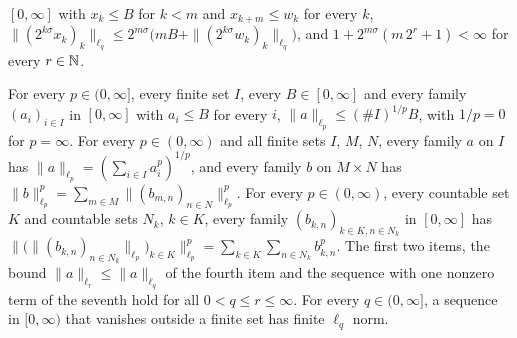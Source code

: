 \begin{lemma}
\begin{enumerate}
    $[0, \infty]$ with $x_k \leq B$ for $k < m$ and $x_{k+m} \leq w_k$ for every $k$,
    $\|(2^{k\sigma} x_k)_k\|_{\ell_q} \leq 2^{m\sigma}
    \bigl( m B + \|(2^{k\sigma} w_k)_k\|_{\ell_q} \bigr)$, and
    $1 + 2^{m\sigma} (m \, 2^r + 1) < \infty$ for every $r \in \mathbb{N}$.
\end{enumerate}
For every $p \in (0, \infty]$, every finite set $I$, every $B \in [0, \infty]$ and every family
$(a_i)_{i \in I}$ in $[0, \infty]$ with $a_i \leq B$ for every $i$,
$\|a\|_{\ell_p} \leq (\# I)^{1/p} B$, with $1/p = 0$ for $p = \infty$. For every
$p \in (0, \infty)$ and all finite sets $I$, $M$, $N$, every family $a$ on $I$ has
$\|a\|_{\ell_p} = (\sum_{i \in I} a_i^p)^{1/p}$, and every family $b$ on $M \times N$ has
$\|b\|_{\ell_p}^p = \sum_{m \in M} \|(b_{m,n})_{n \in N}\|_{\ell_p}^p$. For every
$p \in (0, \infty)$, every countable set $K$ and countable sets $N_k$, $k \in K$, every family
$(b_{k,n})_{k \in K, n \in N_k}$ in $[0, \infty]$ has
$\bigl\|\bigl(\|(b_{k,n})_{n \in N_k}\|_{\ell_p}\bigr)_{k \in K}\bigr\|_{\ell_p}^p
= \sum_{k \in K} \sum_{n \in N_k} b_{k,n}^p$.
The first two items, the bound $\|a\|_{\ell_r} \leq \|a\|_{\ell_q}$ of the fourth item and the
sequence with one nonzero term of the seventh hold for all $0 < q \leq r \leq \infty$. For every
$q \in (0, \infty]$, a sequence in $[0, \infty)$ that vanishes outside a finite set has finite
$\ell_q$ norm.
\end{lemma}

